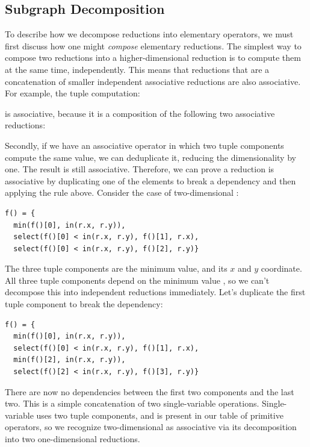 \subsection{Subgraph Decomposition}
\label{subsec:decomposition}

To describe how we decompose reductions into elementary operators, we must first discuss how one might \emph{compose} elementary reductions. The simplest way to compose two reductions into a higher-dimensional reduction is to compute them at the same time, independently. This means that reductions that are a concatenation of smaller independent associative reductions are also associative. For example, the tuple computation:


is associative, because it is a composition of the following two associative reductions:



Secondly, if we have an associative operator in which two tuple components compute the same value, we can deduplicate it, reducing the dimensionality by one. The result is still associative. Therefore, we can prove a reduction is associative by duplicating one of the elements to break a dependency and then applying the rule above. Consider the case of two-dimensional :

\begin{lstlisting}
f() = {
  min(f()[0], in(r.x, r.y)),
  select(f()[0] < in(r.x, r.y), f()[1], r.x),
  select(f()[0] < in(r.x, r.y), f()[2], r.y)}
\end{lstlisting}

The three tuple components are the minimum value, and its $x$ and $y$ coordinate. All three tuple components depend on the minimum value , so we can't decompose this into independent reductions immediately. Let's duplicate the first tuple component to break the dependency:

\begin{lstlisting}
f() = {
  min(f()[0], in(r.x, r.y)),
  select(f()[0] < in(r.x, r.y), f()[1], r.x),
  min(f()[2], in(r.x, r.y)),
  select(f()[2] < in(r.x, r.y), f()[3], r.y)}
\end{lstlisting}

There are now no dependencies between the first two components and the last two. This is a simple concatenation of two single-variable  operations. Single-variable  uses two tuple components, and is present in our table of primitive operators, so we recognize two-dimensional  as associative via its decomposition into two one-dimensional  reductions.

